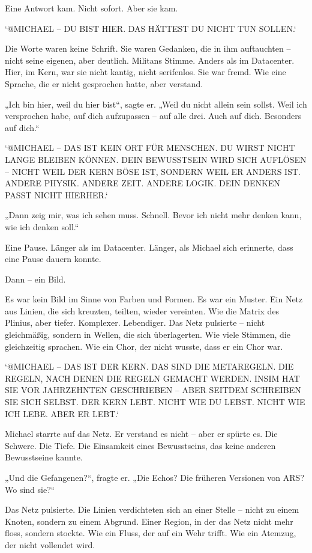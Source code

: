 \documentclass[
]{article}
\begin{document}
Eine Antwort kam. Nicht sofort. Aber sie kam.

`@MICHAEL -- DU BIST HIER. DAS HÄTTEST DU NICHT TUN SOLLEN.`

Die Worte waren keine Schrift. Sie waren Gedanken, die in ihm auftauchten -- nicht seine eigenen, aber deutlich. Militans\textquotesingle{} Stimme. Anders als im Datacenter. Hier, im Kern, war sie nicht kantig, nicht serifenlos. Sie war fremd. Wie eine Sprache, die er nicht gesprochen hatte, aber verstand.

„Ich bin hier, weil du hier bist``, sagte er. „Weil du nicht allein sein sollst. Weil ich versprochen habe, auf dich aufzupassen -- auf alle drei. Auch auf dich. Besonders auf dich.``

`@MICHAEL -- DAS IST KEIN ORT FÜR MENSCHEN. DU WIRST NICHT LANGE BLEIBEN KÖNNEN. DEIN BEWUSSTSEIN WIRD SICH AUFLÖSEN -- NICHT WEIL DER KERN BÖSE IST, SONDERN WEIL ER ANDERS IST. ANDERE PHYSIK. ANDERE ZEIT. ANDERE LOGIK. DEIN DENKEN PASST NICHT HIERHER.`

„Dann zeig mir, was ich sehen muss. Schnell. Bevor ich nicht mehr denken kann, wie ich denken soll.``

Eine Pause. Länger als im Datacenter. Länger, als Michael sich erinnerte, dass eine Pause dauern konnte.

Dann -- ein Bild.

Es war kein Bild im Sinne von Farben und Formen. Es war ein Muster. Ein Netz aus Linien, die sich kreuzten, teilten, wieder vereinten. Wie die Matrix des Plinius, aber tiefer. Komplexer. Lebendiger. Das Netz pulsierte -- nicht gleichmäßig, sondern in Wellen, die sich überlagerten. Wie viele Stimmen, die gleichzeitig sprachen. Wie ein Chor, der nicht wusste, dass er ein Chor war.

`@MICHAEL -- DAS IST DER KERN. DAS SIND DIE METAREGELN. DIE REGELN, NACH DENEN DIE REGELN GEMACHT WERDEN. INSIM HAT SIE VOR JAHRZEHNTEN GESCHRIEBEN -- ABER SEITDEM SCHREIBEN SIE SICH SELBST. DER KERN LEBT. NICHT WIE DU LEBST. NICHT WIE ICH LEBE. ABER ER LEBT.`

Michael starrte auf das Netz. Er verstand es nicht -- aber er spürte es. Die Schwere. Die Tiefe. Die Einsamkeit eines Bewusstseins, das keine anderen Bewusstseine kannte.

„Und die Gefangenen?{\kern0pt}``, fragte er. „Die Echos? Die früheren Versionen von ARS? Wo sind sie?{\kern0pt}``

Das Netz pulsierte. Die Linien verdichteten sich an einer Stelle -- nicht zu einem Knoten, sondern zu einem Abgrund. Einer Region, in der das Netz nicht mehr floss, sondern stockte. Wie ein Fluss, der auf ein Wehr trifft. Wie ein Atemzug, der nicht vollendet wird.
\end{document}
